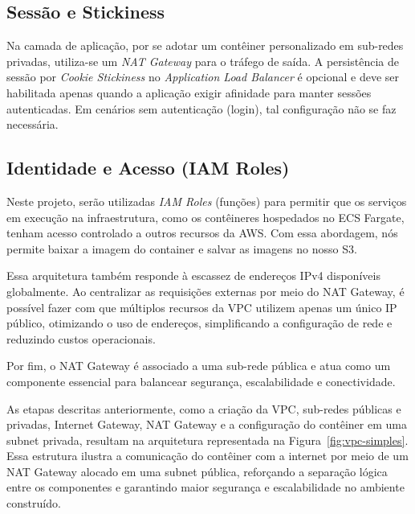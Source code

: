 \subsection{Sessão e Stickiness}
Na camada de aplicação, por se adotar um contêiner personalizado em sub-redes privadas, utiliza-se um \textit{NAT Gateway} para o tráfego de saída. A persistência de sessão por \textit{Cookie Stickiness} no \textit{Application Load Balancer} é opcional e deve ser habilitada apenas quando a aplicação exigir afinidade para manter sessões autenticadas. Em cenários sem autenticação (login), tal configuração não se faz necessária.

\subsection{Identidade e Acesso (IAM Roles)}
Neste projeto, serão utilizadas \textit{IAM Roles} (funções) para permitir que os serviços em execução na infraestrutura, como os contêineres hospedados no ECS Fargate, tenham acesso controlado a outros recursos da AWS. Com essa abordagem, nós permite baixar a imagem do container e salvar as imagens no nosso S3.

Essa arquitetura também responde à escassez de endereços IPv4 disponíveis globalmente. Ao centralizar as requisições externas por meio do NAT Gateway, é possível fazer com que múltiplos recursos da VPC utilizem apenas um único IP público, otimizando o uso de endereços, simplificando a configuração de rede e reduzindo custos operacionais.

Por fim, o NAT Gateway é associado a uma sub-rede pública e atua como um componente essencial para balancear segurança, escalabilidade e conectividade.\cite{aws2024nat}


As etapas descritas anteriormente, como a criação da VPC, sub-redes públicas e privadas, Internet Gateway, NAT Gateway e a configuração do contêiner em uma subnet privada, resultam na arquitetura representada na Figura~\ref{fig:vpc-simples}. Essa estrutura ilustra a comunicação do contêiner com a internet por meio de um NAT Gateway alocado em uma subnet pública, reforçando a separação lógica entre os componentes e garantindo maior segurança e escalabilidade no ambiente construído.

